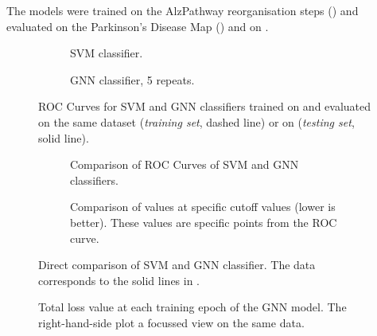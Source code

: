 \documentclass[
	fontsize=10pt, %
	twoside=false, %
	secnumdepth=1, %
  toc=indentunnumbered %
]{kaobook}
\begin{document}

The models were trained on the AlzPathway reorganisation steps (\ADMap)
and evaluated on the Parkinson's Disease Map (\PDMap) and on \ReconMap.

\begin{figure}[h]
  \centering
  \begin{subfigure}[h]{0.49\linewidth}
    \caption{SVM classifier.}
  \end{subfigure}
  \begin{subfigure}[h]{0.49\linewidth}
    \caption{GNN classifier, 5 repeats.  }
  \end{subfigure}
  \caption{ROC Curves for SVM and GNN classifiers trained on \ADMap
    and evaluated on the same dataset (\textit{training set}, dashed line) or on \PDMap
    (\textit{testing set}, solid line).}
  \label{fig:svm-repro-comparison}
\end{figure}
%
\begin{figure}[h]
  \centering
  \begin{subfigure}[h]{0.49\linewidth}
    \caption{Comparison of ROC Curves of SVM and GNN classifiers.}
  \end{subfigure}
  \begin{subfigure}[h]{0.49\linewidth}
    \caption{Comparison of \FPR values at specific \TPR cutoff values (lower is better). These
      values are specific points from the ROC curve.}
  \end{subfigure}
  \caption{Direct comparison of SVM and GNN classifier. The data
    corresponds to the solid lines in .}
  \label{fig:svm-repro-roc-train-test}
\end{figure}


\begin{figure}[h]
  \centering
  \begin{subfigure}[h]{0.49\linewidth}
  \end{subfigure}
  \begin{subfigure}[h]{0.49\linewidth}
  \end{subfigure}
  \caption{Total loss value at each training epoch of the GNN model. The right-hand-side plot a
    focussed view on the same data.}
  \label{fig:svm-repro-loss}
\end{figure}
\end{document}
